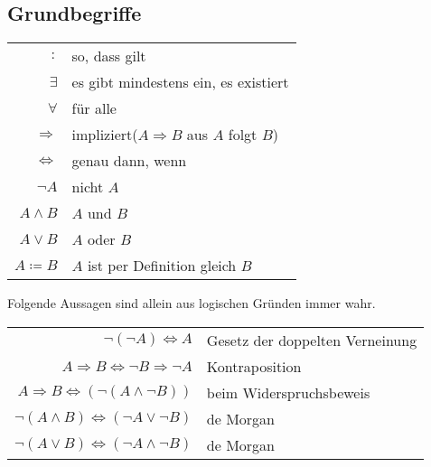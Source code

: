 \documentclass[../ana1.tex]{subfiles}
\begin{document}
\subsection{Grundbegriffe}
\begin{notation}\leavevmode
	\begin{center}
		\begin{tabular}{r|l}
			\(\colon \) & \glqq{}so, dass gilt\grqq{}\\
			\(\exists \) & \glqq{}es gibt mindestens ein\grqq{}, \glqq{}es existiert\grqq{}\\
			\(\forall \) & \glqq{}für alle\grqq{}\\
			\(\Rightarrow \) & \glqq{}impliziert\grqq(\(A \Rightarrow B\) \glqq{}aus \(A\) folgt \(B\)\grqq)\\
			\(\Leftrightarrow \) & \glqq{}genau dann, wenn\grqq{}\\
			\(\neg A\) & nicht \(A\) \\
			\(A \wedge B\) & \(A\) und \(B\) \\
			\(A \vee B\) & \(A\) oder \(B\) \\
			\(A \coloneqq B\) & \(A\) ist per Definition gleich \(B\)
		\end{tabular}
	\end{center}
\end{notation}

\begin{satz}
	Folgende Aussagen sind allein aus logischen Gründen immer wahr.
	\begin{center}
		\begin{tabular}{rl}
			\(\neg(\neg A) \Leftrightarrow A\)                            & Gesetz der doppelten Verneinung \\
			\(A \Rightarrow B \Leftrightarrow \neg B \Rightarrow \neg A\) & Kontraposition                  \\
			\(A \Rightarrow B \Leftrightarrow (\neg (A \wedge \neg B))\)  & beim Widerspruchsbeweis         \\
			\(\neg(A \wedge B) \Leftrightarrow (\neg A \vee \neg B)\)     & de Morgan                       \\
			\(\neg(A \vee B) \Leftrightarrow (\neg A \wedge \neg B)\)     & de Morgan                       \\
		\end{tabular}
	\end{center}
\end{satz}
\end{document}
